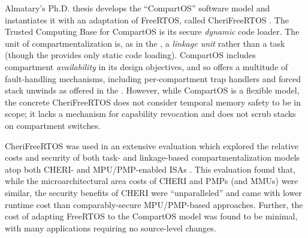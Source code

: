 Almatary's Ph.D. thesis develops the ``CompartOS'' software model \cite{almatary:compartos} and instantiates it with an adaptation of FreeRTOS, called CheriFreeRTOS \cite{almatary:thesis}.
The Trusted Computing Base for CompartOS is its secure \emph{dynamic} code loader.
The unit of compartmentalization is, as in the \cherimcuos{}, a \emph{linkage unit} rather than a task (though the \cherimcuos{} provides only static code loading).
CompartOS includes compartment \emph{availability} in its design objectives, and so offers a multitude of fault-handling mechanisms, including per-compartment trap handlers and forced stack unwinds as offered in the \cherimcuos{}.
However, while CompartOS is a flexible model, the concrete CheriFreeRTOS does not consider temporal memory safety to be in scope; it lacks a mechanism for capability revocation and does not scrub stacks on compartment switches.

CheriFreeRTOS was used in an extensive evaluation which explored the relative costs and security of both task- and linkage-based compartmentalization models atop both CHERI- and MPU/PMP-enabled ISAs \cite[\S 5]{almatary:thesis}.
This evaluation found that, while the microarchitectural area costs of CHERI and PMPs (and MMUs) were similar, the security benefits of CHERI were ``unparalleled'' and came with lower runtime cost than comparably-secure MPU/PMP-based approaches.
Further, the cost of adapting FreeRTOS to the CompartOS model was found to be minimal, with many applications requiring no source-level changes.
